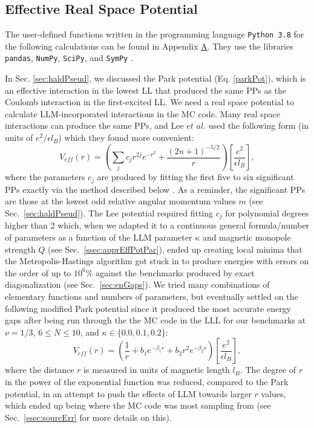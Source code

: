     \subsection{Effective Real Space Potential} \label{ssec:realSpaceEffPot}
    
    The user-defined functions written in the programming language \texttt{Python 3.8} for the following calculations can be found in Appendix \hyperref[appendixA]{A}. They use the libraries \texttt{pandas}, \texttt{NumPy}, \texttt{SciPy}, and \texttt{SymPy} \cite{pandas,numpy,scipy,sympy}. 
    
    In Sec. \ref{sec:haldPseud}, we discussed the Park potential (Eq. \ref{parkPot}), which is an effective interaction in the lowest LL that produced the same PPs as the Coulomb interaction in the first-excited LL. We need a real space potential to calculate LLM-incorporated interactions in the MC code. Many real space interactions can produce the same PPs, and Lee $\textit{et al.}$ used the following form (in units of $e^{2}/\epsilon l_B$) which they found more convenient:
    \begin{equation} \label{leePot}
    V_{eff}(r)=\left(\sum_{j} c_{j} r^{2 j} e^{-r^{2}}+\frac{(2 n+1)^{-5 / 2}}{r}\right)\left[\frac{e^{2}}{\epsilon l_B}\right],
    \end{equation}
    where the parameters $c_j$ are produced by fitting the first five to six significant PPs exactly via the method described below \cite{lee}. As a reminder, the significant PPs are those at the lowest odd relative angular momentum values $m$ (see Sec.~\ref{sec:haldPseud}). The Lee potential required fitting $c_j$ for polynomial degrees higher than 2 which, when we adapted it to a continuous general formula/number of parameters as a function of the LLM parameter $\kappa$ and magnetic monopole strength $Q$ (see Sec.~\ref{ssec:apprEffPotPar}), ended up creating local minima that the Metropolis-Hastings algorithm got stuck in to produce energies with errors on the order of up to $10^6\%$ against the benchmarks produced by exact diagonalization (see Sec.~\ref{sec:enGaps}). We tried many combinations of elementary functions and numbers of parameters, but eventually settled on the following modified Park potential since it produced the most accurate energy gaps after being run through the the MC code in the LLL for our benchmarks at $\nu=1/3$, $6\leq N\leq10$, and $\kappa\in\{0.0,0.1,0.2\}$:
    \begin{equation} \label{modPark}
    V_{eff}(r)=\left(\frac{1}{r}+b_1e^{-\beta_1r}+b_2r^2e^{-\beta_2r}\right)\left[\frac{e^2}{\epsilon l_B}\right],
    \end{equation}
    where the distance $r$ is measured in units of magnetic length $l_B$. The degree of $r$ in the power of the exponential function was reduced, compared to the Park potential, in an attempt to push the effects of LLM towards larger $r$ values, which ended up being where the MC code was most sampling from (see Sec.~\ref{ssec:sourcErr} for more details on this). 
    
